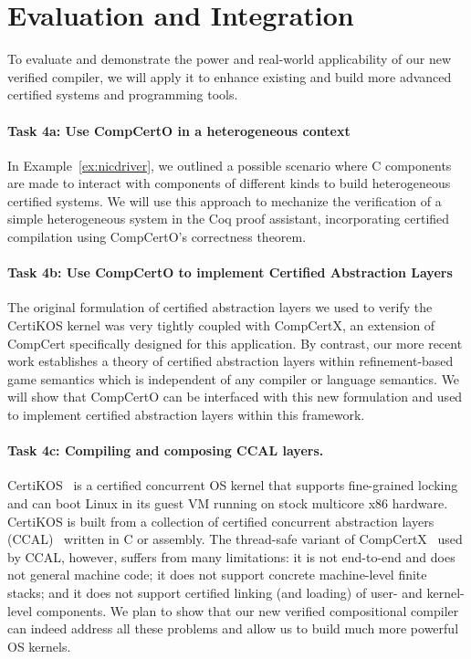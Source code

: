 \section{Evaluation and Integration}

To evaluate and demonstrate the power and real-world applicability of
our new verified compiler, we will apply it to enhance existing and
build more advanced certified systems and programming tools.

\vspace*{-2ex}
\paragraph*{Task 4a: Use CompCertO in a heterogeneous context}

In Example~\ref{ex:nicdriver},
we outlined a possible scenario where C components
are made to interact with components of different kinds
to build heterogeneous certified systems.
We will use this approach to
mechanize the verification of a simple heterogeneous system
in the Coq proof assistant,
incorporating certified compilation using CompCertO's correctness theorem.

\vspace*{-2ex}
\paragraph*{Task 4b: Use CompCertO to implement Certified Abstraction Layers}

The original formulation of certified abstraction layers
we used to verify the CertiKOS kernel \cite{popl15}
was very tightly coupled with CompCertX,
an extension of CompCert specifically designed for this application.
By contrast,
our more recent work establishes a theory of certified abstraction layers
within refinement-based game semantics
which is independent of any compiler
or language semantics.
We will show that CompCertO can be interfaced with this new formulation
and used to implement certified abstraction layers within this framework.

\vspace*{-2ex}
\paragraph*{Task 4c: Compiling and composing CCAL layers.}
CertiKOS~\cite{certikos-osdi16} is a certified concurrent OS kernel
that supports fine-grained locking and can boot Linux in its guest VM
running on stock multicore x86 hardware.  CertiKOS is built from a
collection of certified concurrent abstraction layers
(CCAL)~\cite{ccal18} written in C or assembly.  The thread-safe
variant of CompCertX~\cite{dscal15} used by CCAL, however, suffers
from many limitations: it is not end-to-end and does not general
machine code; it does not support concrete machine-level finite
stacks; and it does not support certified linking (and loading) of
user- and kernel-level components. We plan to show that our new
verified compositional compiler can indeed address all these problems
and allow us to build much more powerful OS kernels.


